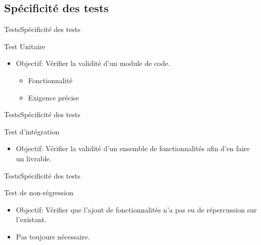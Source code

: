    \subsection{Spécificité des tests}
      \begin{frame}{Tests}{Spécificité des tests}
        \begin{block}{Test Unitaire}
          \begin{itemize}
            \item<1-> Objectif: Vérifier la validité d'un module de code.
            \begin{itemize}
              \item<2-> Fonctionnalité
              \item<3-> Exigence précise
            \end{itemize}
          \end{itemize}
        \end{block}
      \end{frame}
      \begin{frame}{Tests}{Spécificité des tests}
        \begin{block}{Test d'intégration}
          \begin{itemize}
            \item<1-> Objectif: Vérifier la validité d'un ensemble de fonctionnalités afin d'en faire un livrable.
          \end{itemize}
        \end{block}
      \end{frame}
      \begin{frame}{Tests}{Spécificité des tests}
        \begin{block}{Test de non-régression}
          \begin{itemize}
            \item<1-> Objectif: Vérifier que l'ajout de fonctionnalités n'a pas eu de répercussion sur l'existant.
            \item<2-> Pas toujours nécessaire.
          \end{itemize}
        \end{block}
      \end{frame}

